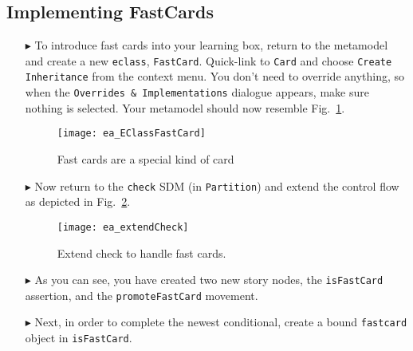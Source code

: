 \newpage
\subsection{Implementing FastCards}
\visHeader
\hypertarget{fastCard vis}{}

\begin{itemize}

\item[$\blacktriangleright$] To introduce fast cards into your learning box, return to the metamodel and create a new \texttt{eclass}, \texttt{FastCard}.
Quick-link to \texttt{Card} and choose \texttt{Create Inheritance} from the context menu. You don't need to override anything, so
when the \texttt{Overrides \& Implementations} dialogue appears, make sure nothing is selected. Your metamodel should now resemble
Fig.~\ref{fig:metamodel_FastCard}.

\vspace{0.5cm}

\begin{figure}[htp]
\begin{center}
  \texttt{[image: ea\_EClassFastCard]}
  \caption{Fast cards are a special kind of card}  
  \label{fig:metamodel_FastCard}
\end{center}
\end{figure}

\vspace{0.5cm}

\item[$\blacktriangleright$] Now return to the \texttt{check} SDM (in \texttt{Partition}) and extend the control flow as depicted in
Fig.~\ref{fig:extendCheck}.

\begin{figure}[htbp]
\begin{center}
  \texttt{[image: ea\_extendCheck]}
  \caption{Extend check to handle fast cards.}  
  \label{fig:extendCheck}
\end{center}
\end{figure}
 
 \vspace{0.5cm}
 
\item[$\blacktriangleright$] As you can see, you have created two new story nodes, the \texttt{isFastCard} assertion, and the \texttt{promoteFastCard} movement.

\vspace{0.5cm}
 
\item[$\blacktriangleright$] Next, in order to complete the newest conditional, create a bound \texttt{fastcard} object in \texttt{isFastCard}. 


\end{itemize}

